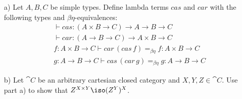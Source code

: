 \begin{exercise}
    \label{ex:exp}
    \begin{itemize}
        \item[a)] Let $A, B, C$ be simple types.
            Define lambda terms $cas$ and $car$ with the following types and $\beta\eta$-equivalences:
            \begin{align*}
                & \vdash cas: (A \times B \to C) \to A \to B \to C \\
                & \vdash car: (A \to B \to C) \to A \times B \to C\\
                & f: A \times B \to C \vdash car\, (cas\, f) =_{\beta\eta} f : A \times B \to C \\
                & g: A \to B \to C \vdash cas\, (car\, g) =_{\beta\eta} g : A \to B \to C
            \end{align*}
        \item[b)] Let $\cat{C}$ be an arbitrary cartesian closed category and $X, Y, Z \in \cat{C}$.
            Use part a) to show that $Z^{X \times Y} \iso (Z^Y)^X$.
    \end{itemize}
\end{exercise}
